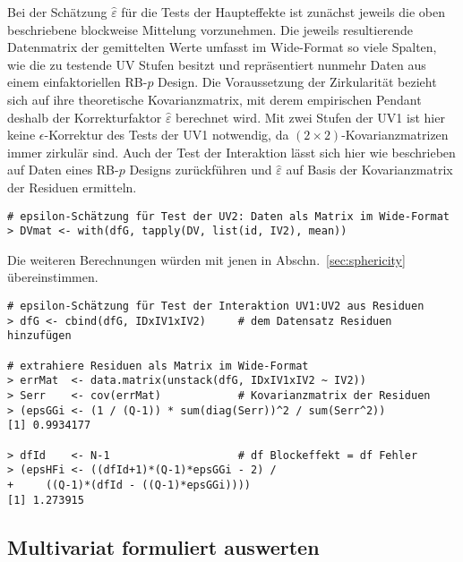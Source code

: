 Bei der Schätzung $\hat{\varepsilon}$ für die Tests der Haupteffekte ist zunächst jeweils die oben beschriebene blockweise Mittelung vorzunehmen. Die jeweils resultierende Datenmatrix der gemittelten Werte umfasst im Wide-Format so viele Spalten, wie die zu testende UV Stufen besitzt und repräsentiert nunmehr Daten aus einem einfaktoriellen RB-$p$ Design. Die Voraussetzung der Zirkularität bezieht sich auf ihre theoretische Kovarianzmatrix, mit derem empirischen Pendant deshalb der Korrekturfaktor $\hat{\varepsilon}$ berechnet wird. Mit zwei Stufen der UV1 ist hier keine $\epsilon$-Korrektur des Tests der UV1 notwendig, da $(2 \times 2)$-Kovarianzmatrizen immer zirkulär sind. Auch der Test der Interaktion lässt sich hier wie beschrieben auf Daten eines RB-$p$ Designs zurückführen und $\hat{\varepsilon}$ auf Basis der Kovarianzmatrix der Residuen ermitteln.
\begin{lstlisting}
# epsilon-Schätzung für Test der UV2: Daten als Matrix im Wide-Format
> DVmat <- with(dfG, tapply(DV, list(id, IV2), mean))
\end{lstlisting}

Die weiteren Berechnungen würden mit jenen in Abschn.\ \ref{sec:sphericity} übereinstimmen.

\begin{lstlisting}
# epsilon-Schätzung für Test der Interaktion UV1:UV2 aus Residuen
> dfG <- cbind(dfG, IDxIV1xIV2)     # dem Datensatz Residuen hinzufügen

# extrahiere Residuen als Matrix im Wide-Format
> errMat  <- data.matrix(unstack(dfG, IDxIV1xIV2 ~ IV2))
> Serr    <- cov(errMat)            # Kovarianzmatrix der Residuen
> (epsGGi <- (1 / (Q-1)) * sum(diag(Serr))^2 / sum(Serr^2))
[1] 0.9934177

> dfId    <- N-1                    # df Blockeffekt = df Fehler
> (epsHFi <- ((dfId+1)*(Q-1)*epsGGi - 2) /
+     ((Q-1)*(dfId - ((Q-1)*epsGGi))))
[1] 1.273915
\end{lstlisting}

\subsection{Multivariat formuliert auswerten}

